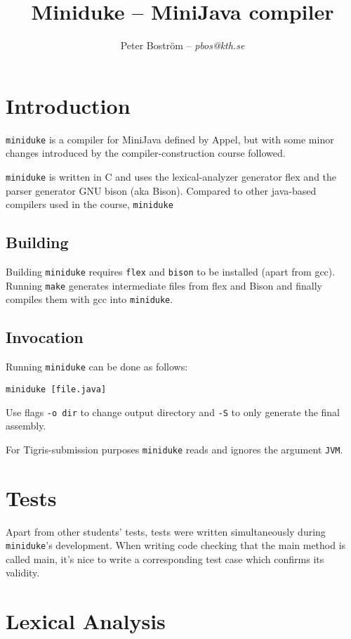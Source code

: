 \documentclass[a4paper,11pt]{article}
\title{Miniduke -- MiniJava compiler}
\author{Peter Boström -- \emph{pbos@kth.se}}
\begin{document}
\maketitle
\pagestyle{fancyplain}

\section*{Introduction}

{\tt miniduke} is a compiler for MiniJava defined by Appel, but with some minor
changes introduced by the compiler-construction course followed.

{\tt miniduke} is written in C and uses the lexical-analyzer generator flex and the
parser generator GNU bison (aka Bison). Compared to other java-based compilers
used in the course, {\tt miniduke}

\subsection*{Building}

Building {\tt miniduke} requires {\tt flex} and {\tt bison} to be installed
(apart from gcc). Running {\tt make} generates intermediate files from flex
and Bison and finally compiles them with gcc into {\tt miniduke}.

\subsection*{Invocation}

Running {\tt miniduke} can be done as follows:

{\tt miniduke [file.java]}

Use flags {\tt -o dir} to change output directory and {\tt -S} to only generate
the final assembly.

For Tigris-submission purposes {\tt miniduke} reads and ignores the argument
{\tt JVM}.

\section*{Tests}

Apart from other students' tests, tests were written simultaneously during
{\tt miniduke}'s development. When writing code checking that the main method
is called main, it's nice to write a corresponding test case which confirms
its validity.

\section*{Lexical Analysis}
\end{document}
